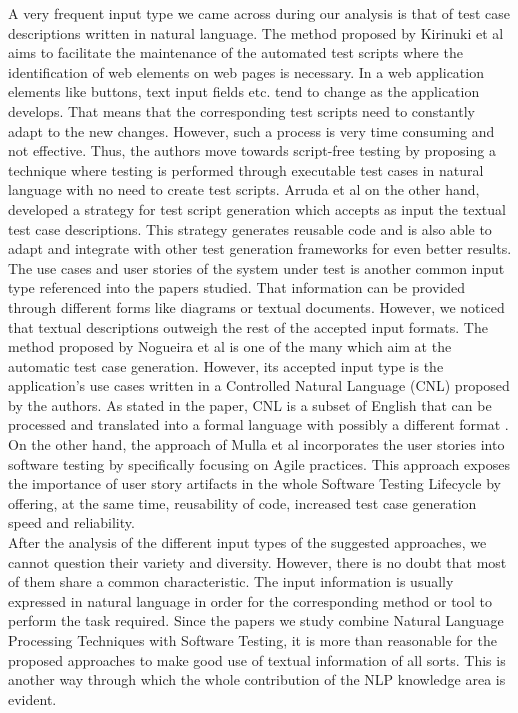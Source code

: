 A very frequent input type we came across during our analysis is that of test case descriptions written in natural language. The method proposed 
by Kirinuki et al \cite{9609160} aims to facilitate the maintenance of the automated test scripts where the identification of web elements on 
web pages is necessary. In a web application elements like buttons, text input fields etc. tend to change as the application develops. That 
means that the corresponding test scripts need to constantly adapt to the new changes. However, such a process is very time consuming and 
not effective. Thus, the authors move towards script-free testing by proposing a technique where testing is performed through executable test 
cases in natural language with no need to create test scripts. Arruda et al \cite{arruda2020automation} on the other hand, developed a strategy 
for test script generation which accepts as input the textual test case descriptions. This strategy generates reusable code and is also able 
to adapt and integrate with other test generation frameworks for even better results.\\

The use cases and user stories of the system under test is another common input type referenced into the papers studied. That information can be provided through different forms like diagrams or 
textual documents. However, we noticed that textual descriptions outweigh the rest of the accepted input formats. The method proposed by Nogueira et al \cite{nogueira2015automatic} is one of the many which 
aim at the automatic test case generation. However, its accepted input type is the application's use cases written in a Controlled Natural Language (CNL) proposed by the authors. As stated in the paper, CNL 
is a subset of English that can be processed and translated into a formal language with possibly a different format \cite{nogueira2015automatic}. On the other hand, the approach of Mulla et al \cite{mulla2020potent} 
incorporates the user stories into software testing by specifically focusing on Agile practices. This approach exposes the importance of user story artifacts in the whole Software Testing Lifecycle by 
offering, at the same time, reusability of code, increased test case generation speed and reliability.\\

After the analysis of the different input types of the suggested approaches, we cannot question their variety and diversity. However, there is no doubt that most of them share a common characteristic. The input 
information is usually expressed in natural language in order for the corresponding method or tool to perform the task required. Since the papers we study combine Natural Language Processing Techniques with 
Software Testing, it is more than reasonable for the proposed approaches to make good use of textual information of all sorts. This is another way through which the whole contribution of the NLP knowledge area is evident.


